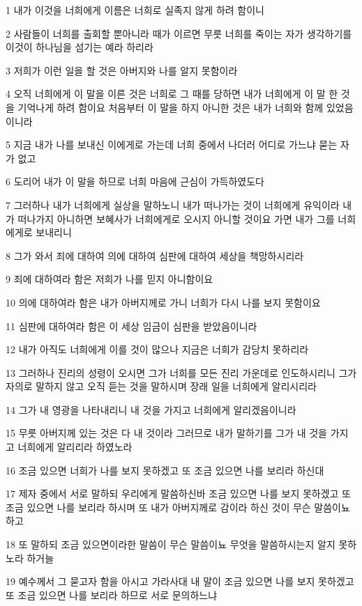 \par 1 내가 이것을 너희에게 이름은 너희로 실족지 않게 하려 함이니
\par 2 사람들이 너희를 출회할 뿐아니라 때가 이르면 무릇 너희를 죽이는 자가 생각하기를 이것이 하나님을 섬기는 예라 하리라
\par 3 저희가 이런 일을 할 것은 아버지와 나를 알지 못함이라
\par 4 오직 너희에게 이 말을 이른 것은 너희로 그 때를 당하면 내가 너희에게 이 말 한 것을 기억나게 하려 함이요 처음부터 이 말을 하지 아니한 것은 내가 너희와 함께 있었음이니라
\par 5 지금 내가 나를 보내신 이에게로 가는데 너희 중에서 나더러 어디로 가느냐 묻는 자가 없고
\par 6 도리어 내가 이 말을 하므로 너희 마음에 근심이 가득하였도다
\par 7 그러하나 내가 너희에게 실상을 말하노니 내가 떠나가는 것이 너희에게 유익이라 내가 떠나가지 아니하면 보혜사가 너희에게로 오시지 아니할 것이요 가면 내가 그를 너희에게로 보내리니
\par 8 그가 와서 죄에 대하여 의에 대하여 심판에 대하여 세상을 책망하시리라
\par 9 죄에 대하여라 함은 저희가 나를 믿지 아니함이요
\par 10 의에 대하여라 함은 내가 아버지께로 가니 너희가 다시 나를 보지 못함이요
\par 11 심판에 대하여라 함은 이 세상 임금이 심판을 받았음이니라
\par 12 내가 아직도 너희에게 이를 것이 많으나 지금은 너희가 감당치 못하리라
\par 13 그러하나 진리의 성령이 오시면 그가 너희를 모든 진리 가운데로 인도하시리니 그가 자의로 말하지 않고 오직 듣는 것을 말하시며 장래 일을 너희에게 알리시리라
\par 14 그가 내 영광을 나타내리니 내 것을 가지고 너희에게 알리겠음이니라
\par 15 무릇 아버지께 있는 것은 다 내 것이라 그러므로 내가 말하기를 그가 내 것을 가지고 너희에게 알리리라 하였노라
\par 16 조금 있으면 너희가 나를 보지 못하겠고 또 조금 있으면 나를 보리라 하신대
\par 17 제자 중에서 서로 말하되 우리에게 말씀하신바 조금 있으면 나를 보지 못하겠고 또 조금 있으면 나를 보리라 하시며 또 내가 아버지께로 감이라 하신 것이 무슨 말씀이뇨 하고
\par 18 또 말하되 조금 있으면이라한 말씀이 무슨 말씀이뇨 무엇을 말씀하시는지 알지 못하노라 하거늘
\par 19 예수께서 그 묻고자 함을 아시고 가라사대 내 말이 조금 있으면 나를 보지 못하겠고 또 조금 있으면 나를 보리라 하므로 서로 문의하느냐

